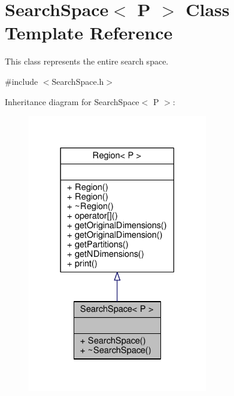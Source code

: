 \hypertarget{classSearchSpace}{}\section{Search\+Space$<$ P $>$ Class Template Reference}
\label{classSearchSpace}


This class represents the entire search space.  




{\ttfamily \#include $<$Search\+Space.\+h$>$}



Inheritance diagram for Search\+Space$<$ P $>$\+:
\nopagebreak
\begin{figure}[H]
\begin{center}
\leavevmode
\includegraphics[width=222pt]{classSearchSpace__inherit__graph}
\end{center}
\end{figure}


